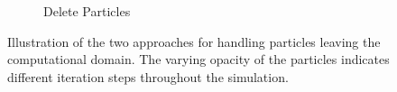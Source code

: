 \begin{figure}[H]
\begin{subfigure}[b]{0.45\textwidth}
        \caption{Delete Particles}
    \end{subfigure}
    \caption{Illustration of the two approaches for handling particles leaving the computational domain. The varying opacity of the particles indicates different iteration steps throughout the simulation.}
\end{figure}

